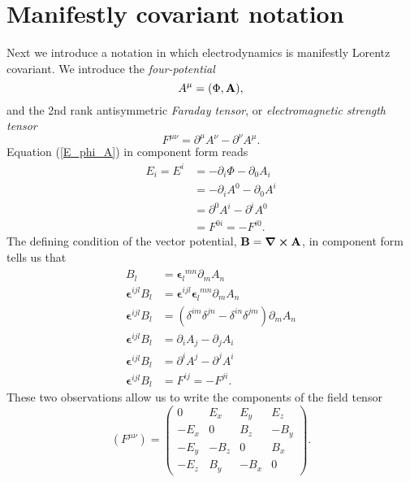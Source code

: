 \section{Manifestly covariant notation}
Next we introduce a notation in which electrodynamics is manifestly Lorentz covariant. We introduce the \textit{four-potential}
\begin{equation}
    A^\mu=(\Phi,\vb{A}),
\end{equation}
and the 2nd rank antisymmetric \textit{Faraday tensor}, or \textit{electromagnetic strength tensor}
\begin{equation}
  F^{\mu\nu}=\partial^\mu A^\nu-\partial^\nu A^\mu.
\end{equation}
Equation (\ref{E_phi_A}) in component form reads
\begin{equation}
\begin{aligned}
    E_i=E^i&=-\partial_i\Phi-\partial_0A_i\\
    &=-\partial_iA^0-\partial_0 A^i\\
    &=\partial^0A^i-\partial^i A^0\\
    &=F^{0i}=-F^{i0}.
\end{aligned}
\end{equation}
The defining condition of the vector potential, $\vb{B}=\curl\vb{A}$, in component form tells us that
\begin{equation}
\begin{aligned}
    B_l&=\boldsymbol{\epsilon}_l^{\phantom{i}mn}\partial_mA_n\\
    \boldsymbol{\epsilon}^{ijl}B_l&=\boldsymbol{\epsilon}^{ijl}\boldsymbol{\epsilon}_l^{\phantom{i}mn}\partial_mA_n\\
    \boldsymbol{\epsilon}^{ijl}B_l&=(\delta^{im}\delta^{jn}-\delta^{in}\delta^{jm})\partial_mA_n\\
    \boldsymbol{\epsilon}^{ijl}B_l&=\partial_i A_j-\partial_j A_i\\
    \boldsymbol{\epsilon}^{ijl}B_l&=\partial^i A^j-\partial^j A^i\\
    \boldsymbol{\epsilon}^{ijl}B_l&=F^{ij}=-F^{ji}.
\end{aligned}
\end{equation}
These two observations allow us to write the components of the field tensor 
\begin{equation}
\left(F^{\mu\nu}\right)=\left(\begin{array}{cccc}
0 & E_{x} & E_{y} & E_{z} \\
-E_{x} & 0 & B_{z} & -B_{y} \\
-E_{y} & -B_{z} & 0 & B_{x} \\
-E_{z} & B_{y} & -B_{x} & 0
\end{array}\right).
\end{equation}


